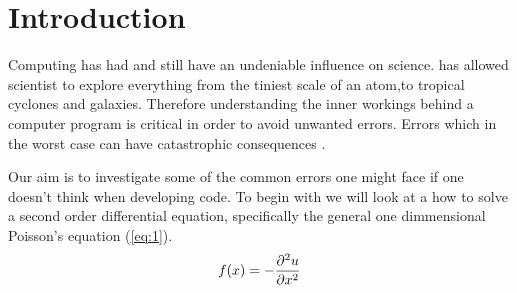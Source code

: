 \section*{Introduction}
Computing has had and still have an undeniable influence on science.
has allowed scientist to explore everything from the tiniest scale of an atom,to tropical cyclones and galaxies.
Therefore understanding the inner workings behind a computer program is critical in order to avoid unwanted errors. Errors which in the worst case can have catastrophic consequences \cite{sleipner_failure}. \par Our aim is to investigate some of the common errors one might face if one doesn't think when developing code. To begin with we will look at a how to solve a second order differential equation, specifically the general one dimmensional Poisson's equation (\ref{eq:1}).
\begin{equation}\label{eq:2}
  f(x)= - \pd[^2u]{x^2}
\end{equation}
